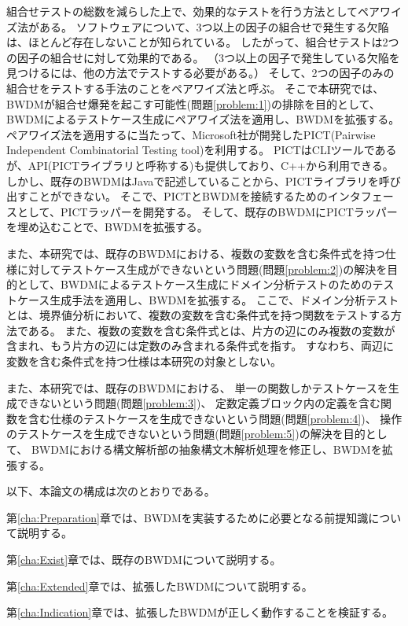 \documentclass[uplatex, report, a4j, 10pt]{jsbook}
\newcommand{\tool}{BWDM}
\begin{document}
組合せテストの総数を減らした上で、効果的なテストを行う方法としてペアワイズ法がある。
ソフトウェアについて、3つ以上の因子の組合せで発生する欠陥は、ほとんど存在しないことが知られている\cite{over3fact}。
したがって、組合せテストは2つの因子の組合せに対して効果的である。
（3つ以上の因子で発生している欠陥を見つけるには、他の方法でテストする必要がある。）
そして、2つの因子のみの組合せをテストする手法のことをペアワイズ法と呼ぶ。
そこで本研究では、BWDMが組合せ爆発を起こす可能性(問題\ref{problem:1})の排除を目的として、BWDMによるテストケース生成にペアワイズ法を適用し、BWDMを拡張する。
ペアワイズ法を適用するに当たって、Microsoft社が開発したPICT(Pairwise Independent Combinatorial Testing tool)\cite{pict}を利用する。
PICTはCLIツールであるが、API(PICTライブラリと呼称する)も提供しており、C++から利用できる。
しかし、既存のBWDMはJavaで記述していることから、PICTライブラリを呼び出すことができない。
そこで、PICTとBWDMを接続するためのインタフェースとして、PICTラッパーを開発する。
そして、既存のBWDMにPICTラッパーを埋め込むことで、BWDMを拡張する。

また、本研究では、既存のBWDMにおける、複数の変数を含む条件式を持つ仕様に対してテストケース生成ができないという問題(問題\ref{problem:2})の解決を目的として、BWDMによるテストケース生成にドメイン分析テストのためのテストケース生成手法を適用し、BWDMを拡張する。
ここで、ドメイン分析テスト\cite{izon}\cite{jstqb}とは、境界値分析において、複数の変数を含む条件式を持つ関数をテストする方法である。
また、複数の変数を含む条件式とは、片方の辺にのみ複数の変数が含まれ、もう片方の辺には定数のみ含まれる条件式を指す。
すなわち、両辺に変数を含む条件式を持つ仕様は本研究の対象としない。

また、本研究では、既存のBWDMにおける、
単一の関数しかテストケースを生成できないという問題(問題\ref{problem:3})、
定数定義ブロック内の定義を含む関数を含む仕様のテストケースを生成できないという問題(問題\ref{problem:4})、
操作のテストケースを生成できないという問題(問題\ref{problem:5})の解決を目的として、
BWDMにおける構文解析部の抽象構文木解析処理を修正し、BWDMを拡張する。

以下、本論文の構成は次のとおりである。

第\ref{cha:Preparation}章では、\tool{}を実装するために必要となる前提知識について説明する。

第\ref{cha:Exist}章では、既存の\tool{}について説明する。

第\ref{cha:Extended}章では、拡張した\tool{}について説明する。

第\ref{cha:Indication}章では、拡張した\tool{}が正しく動作することを検証する。
\end{document}
